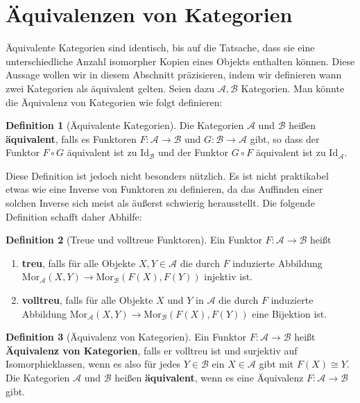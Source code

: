\documentclass{article}
\theoremstyle{plain}
\theoremstyle{definition}
\newtheorem{defn}{Definition}[section]
\theoremstyle{remark}
\begin{document}
\section{Äquivalenzen von Kategorien}
Äquivalente Kategorien sind identisch, bis auf die Tatsache, dass sie eine unterschiedliche Anzahl isomorpher Kopien eines Objekts enthalten können. Diese Aussage wollen wir in diesem Abschnitt präzisieren, indem wir definieren wann zwei Kategorien als äquivalent gelten. Seien dazu $\mathcal{A}, \mathcal{B}$ Kategorien. Man könnte die Äquivalenz von Kategorien wie folgt definieren:

\begin{defn}[Äquivalente Kategorien]
Die Kategorien $\mathcal{A}$ und $\mathcal{B}$ heißen \textbf{äquivalent}, falls es Funktoren $F: \mathcal{A} \rightarrow \mathcal{B}$ und $G: \mathcal{B} \rightarrow \mathcal{A}$ gibt, so dass der Funktor $F \circ G$ äquivalent ist zu $\text{Id}_{\mathcal{B}}$ und der Funktor $G \circ F$ äquivalent ist zu $\text{Id}_\mathcal{A}$.
\end{defn}

Diese Definition ist jedoch nicht besonders nützlich. Es ist nicht praktikabel etwas wie eine Inverse von Funktoren zu definieren, da das Auffinden einer solchen Inverse sich meist als äußerst schwierig herausstellt. Die folgende Definition schafft daher Abhilfe:

\begin{defn}[Treue und volltreue Funktoren]
Ein Funktor $F: \mathcal{A} \rightarrow \mathcal{B}$ heißt
\begin{enumerate}
	\item \textbf{treu}, falls für alle Objekte $X,Y \in \mathcal{A}$ die durch $F$ induzierte Abbildung $\text{Mor}_\mathcal{A}(X,Y) \rightarrow \text{Mor}_\mathcal{B}(F(X),F(Y))$ injektiv ist.
	\item \textbf{volltreu}, falls für alle Objekte $X$ und $Y$ in $\mathcal{A}$ die durch $F$ induzierte Abbildung $\text{Mor}_\mathcal{A}(X,Y) \rightarrow \text{Mor}_\mathcal{B}(F(X),F(Y))$ eine Bijektion ist.
\end{enumerate}
\end{defn}

\begin{defn}[Äquivalenz von Kategorien]
Ein Funktor $F: \mathcal{A} \rightarrow \mathcal{B}$ heißt \textbf{Äquivalenz von Kategorien}, falls er volltreu ist und surjektiv auf Isomorphieklassen, wenn es also für jedes $Y \in \mathcal{B}$ ein $X \in \mathcal{A}$ gibt mit $F(X) \cong Y$. Die Kategorien $\mathcal{A}$ und $\mathcal{B}$ heißen \textbf{äquivalent}, wenn es eine Äquivalenz $F: \mathcal{A} \rightarrow \mathcal{B}$ gibt.
\end{defn}
\end{document}
